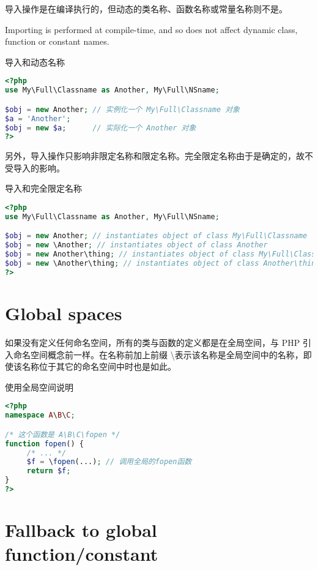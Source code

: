 导入操作是在编译执行的，但动态的类名称、函数名称或常量名称则不是。 

Importing is performed at compile-time, and so does not affect dynamic class, function or constant names.

\begin{example}
导入和动态名称
\begin{lstlisting}[language=PHP]
<?php
use My\Full\Classname as Another, My\Full\NSname;

$obj = new Another; // 实例化一个 My\Full\Classname 对象
$a = 'Another';
$obj = new $a;      // 实际化一个 Another 对象
?>
\end{lstlisting}
\end{example}

另外，导入操作只影响非限定名称和限定名称。完全限定名称由于是确定的，故不受导入的影响。


\begin{example}
导入和完全限定名称
\begin{lstlisting}[language=PHP]
<?php
use My\Full\Classname as Another, My\Full\NSname;

$obj = new Another; // instantiates object of class My\Full\Classname
$obj = new \Another; // instantiates object of class Another
$obj = new Another\thing; // instantiates object of class My\Full\Classname\thing
$obj = new \Another\thing; // instantiates object of class Another\thing
?>
\end{lstlisting}
\end{example}

\chapter{Global spaces}

如果没有定义任何命名空间，所有的类与函数的定义都是在全局空间，与 PHP 引入命名空间概念前一样。在名称前加上前缀 \textbackslash 表示该名称是全局空间中的名称，即使该名称位于其它的命名空间中时也是如此。



\begin{example}
使用全局空间说明
\begin{lstlisting}[language=PHP]
<?php
namespace A\B\C;

/* 这个函数是 A\B\C\fopen */
function fopen() { 
     /* ... */
     $f = \fopen(...); // 调用全局的fopen函数
     return $f;
} 
?>
\end{lstlisting}
\end{example}

\chapter{Fallback to global function/constant}



